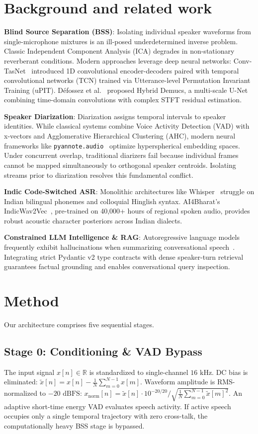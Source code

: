 \documentclass[11pt,a4paper,twocolumn]{article}
\begin{document}
\section{Background and related work}
\textbf{Blind Source Separation (BSS)}: Isolating individual speaker waveforms from single-microphone mixtures is an ill-posed underdetermined inverse problem. Classic Independent Component Analysis (ICA) degrades in non-stationary reverberant conditions. Modern approaches leverage deep neural networks: Conv-TasNet~\cite{luo2019convtasnet} introduced 1D convolutional encoder-decoders paired with temporal convolutional networks (TCN) trained via Utterance-level Permutation Invariant Training (uPIT). D{\'e}fossez et al.~\cite{defossez2021demucs} proposed Hybrid Demucs, a multi-scale U-Net combining time-domain convolutions with complex STFT residual estimation.

\textbf{Speaker Diarization}: Diarization assigns temporal intervals to speaker identities. While classical systems combine Voice Activity Detection (VAD) with x-vectors and Agglomerative Hierarchical Clustering (AHC), modern neural frameworks like \texttt{pyannote.audio}~\cite{bredin2020pyannote} optimize hyperspherical embedding spaces. Under concurrent overlap, traditional diarizers fail because individual frames cannot be mapped simultaneously to orthogonal speaker centroids. Isolating streams prior to diarization resolves this fundamental conflict.

\textbf{Indic Code-Switched ASR}: Monolithic architectures like Whisper~\cite{radford2023whisper} struggle on Indian bilingual phonemes and colloquial Hinglish syntax. AI4Bharat's IndicWav2Vec~\cite{javed2022indicwav2vec}, pre-trained on 40,000+ hours of regional spoken audio, provides robust acoustic character posteriors across Indian dialects.

\textbf{Constrained LLM Intelligence \& RAG}: Autoregressive language models frequently exhibit hallucinations when summarizing conversational speech~\cite{russell2021aima}. Integrating strict Pydantic v2 type contracts with dense speaker-turn retrieval guarantees factual grounding and enables conversational query inspection.

\section{Method}
Our architecture comprises five sequential stages.

\subsection{Stage 0: Conditioning \& VAD Bypass}
The input signal $x[n] \in \mathbb{R}$ is standardized to single-channel $16\text{ kHz}$. DC bias is eliminated: $\tilde{x}[n] = x[n] - \frac{1}{N}\sum_{m=0}^{N-1} x[m]$. Waveform amplitude is RMS-normalized to $-20\text{ dBFS}$:
$x_{\text{norm}}[n] = \tilde{x}[n] \cdot 10^{-20/20} / \sqrt{\frac{1}{N}\sum_{m=0}^{N-1} \tilde{x}[m]^2}$.
An adaptive short-time energy VAD evaluates speech activity. If active speech occupies only a single temporal trajectory with zero cross-talk, the computationally heavy BSS stage is bypassed.
\end{document}
